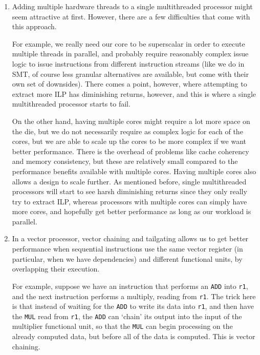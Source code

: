 


\begin{enumerate}[label=(\alph*)]
  \item
    Adding multiple hardware threads to a single multithreaded processor might seem attractive at first. However, there are a few difficulties that come with this approach.

    For example, we really need our core to be superscalar in order to execute multiple threads in parallel, and probably require reasonably complex issue logic to issue instructions from different instruction streams (like we do in SMT, of course less granular alternatives are available, but come with their own set of downsides). There comes a point, however, where attempting to extract more ILP has diminishing returns, however, and this is where a single multithreaded processor starts to fail.

    On the other hand, having multiple cores might require a lot more space on the die, but we do not necessarily require as complex logic for each of the cores, but we are able to scale up the cores to be more complex if we want better performance. There is the overhead of problems like cache coherency and memory consistency, but these are relatively small compared to the performance benefits available with multiple cores. Having multiple cores also allows a design to scale further. As mentioned before, single multithreaded processors will start to see harsh diminishing returns since they only really try to extract ILP, whereas processors with multiple cores can simply have more cores, and hopefully get better performance as long as our workload is parallel.

  \item
    In a vector processor, vector chaining and tailgating allows us to get better performance when sequential instructions use the same vector register (in particular, when we have dependencies) and different functional units, by overlapping their execution.

    For example, suppose we have an instruction that performs an \texttt{ADD} into \texttt{r1}, and the next instruction performs a multiply, reading from \texttt{r1}. The trick here is that  instead of waiting for the \texttt{ADD} to write its data into \texttt{r1}, and then have the \texttt{MUL} read from \texttt{r1}, the \texttt{ADD} can `chain' its output into the input of the multiplier functional unit, so that the \texttt{MUL} can begin processing on the already computed data, but before all of the data is computed. This is vector chaining.


\end{enumerate}
